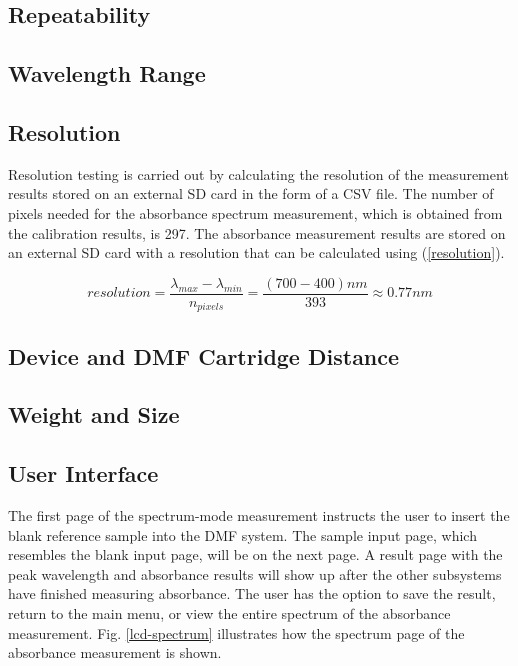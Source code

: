 \documentclass[conference]{IEEEtran}
\begin{document}
\subsection{Repeatability}
\subsection{Wavelength Range}
\subsection{Resolution}
Resolution testing is carried out by calculating the resolution of the measurement results stored on an external SD card in the form of a CSV file.
The number of pixels needed for the absorbance spectrum measurement, which is obtained from the calibration results, is 297.
The absorbance measurement results are stored on an external SD card with a resolution that can be calculated using (\ref{resolution}).

\begin{equation}
    resolution=\frac{\lambda_{max} - \lambda_{min}}{n_{pixels}}=\frac{(700 - 400)nm}{393}\approx0.77nm
    \label{resolution}
    \end{equation}

\subsection{Device and DMF Cartridge Distance}

\subsection{Weight and Size}

\subsection{User Interface}
The first page of the spectrum-mode measurement instructs the user to insert the blank reference sample into the DMF system.
The sample input page, which resembles the blank input page, will be on the next page.
A result page with the peak wavelength and absorbance results will show up after the other subsystems have finished measuring absorbance.
The user has the option to save the result, return to the main menu, or view the entire spectrum of the absorbance measurement.
Fig. \ref{lcd-spectrum} illustrates how the spectrum page of the absorbance measurement is shown.
\end{document}

